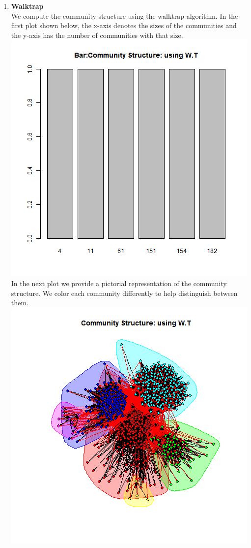 \documentclass{article}
\begin{document}
\begin{enumerate}
\item \textbf{Walktrap}\\
 We compute the community structure using the walktrap algorithm.
 In the first plot shown below, the x-axis denotes the sizes of the communities and the y-axis has the number of communities with that size.\\
	\includegraphics[scale=0.4]{7_2f} \\
	In the next plot we provide a pictorial representation of the community structure.
	We color each community differently to help distinguish between them.\\
	\includegraphics[scale=0.7]{7_2g} \\ 


\end{enumerate}
\end{document}
